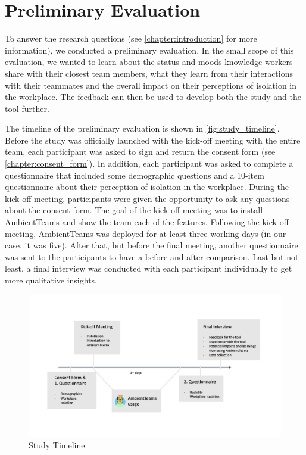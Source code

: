 \chapter{Preliminary Evaluation}
\label{chapter:preliminary_evaluation}
To answer the research questions (see \autoref{chapter:introduction} for more information), we conducted a preliminary evaluation. In the small scope of this evaluation, we wanted to learn about the status and moods knowledge workers share with their closest team members, what they learn from their interactions with their teammates and the overall impact on their perceptions of isolation in the workplace. The feedback can then be used to develop both the study and the tool further.

The timeline of the preliminary evaluation is shown in \autoref{fig:study_timeline}. Before the study was officially launched with the kick-off meeting with the entire team, each participant was asked to sign and return the consent form (see \autoref{chapter:consent_form}). In addition, each participant was asked to complete a questionnaire that included some demographic questions and a 10-item questionnaire about their perception of isolation in the workplace. During the kick-off meeting, participants were given the opportunity to ask any questions about the consent form. The goal of the kick-off meeting was to install AmbientTeams and show the team each of the features. Following the kick-off meeting, AmbientTeams was deployed for at least three working days (in our case, it was five). After that, but before the final meeting, another questionnaire was sent to the participants to have a before and after comparison. Last but not least, a final interview was conducted with each participant individually to get more qualitative insights.

\begin{figure}[h]
    \centering
    \includegraphics[width=.8\linewidth]{./images/Study_Timeline.png}
    \caption{Study Timeline}
    \label{fig:study_timeline}
\end{figure}

